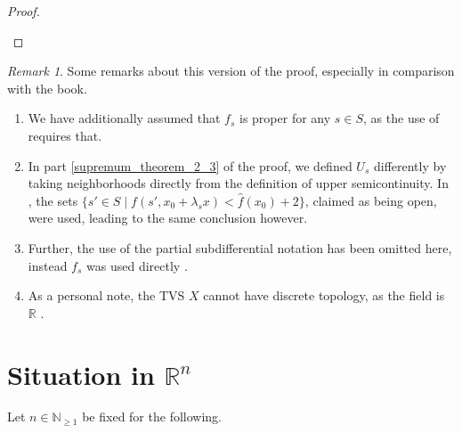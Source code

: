 \documentclass[10pt, leqno]{amsart}
\theoremstyle{definition}
\theoremstyle{remark}
\newtheorem{remark}[theorem]{Remark}
\newcommand{\draftcommentdone}{}
\begin{document}
\begin{proof}
\begin{enumerate}[label=(\roman*), wide]
\begin{enumerate}[label=(\alph*), wide]
\begin{enumerate}[label=\arabic*., wide]
                    
                \end{enumerate}
            \end{enumerate}
        \end{enumerate}
    \end{proof}

    \begin{remark}
        Some remarks about this version of the proof, especially in comparison with the book.
        \begin{enumerate}[label=(\roman*), wide]
            \item We have additionally assumed that \(f_s\) is proper for any \(s \in S\), as the use of \cite[p. 199]{IoffeTihomirov} requires that.
            \item In part \ref{supremum_theorem_2_3} of the proof, we defined \(U_s\) differently by taking neighborhoods directly from the definition of upper semicontinuity. In \cite[pp. 201-204]{IoffeTihomirov}, the sets \(\{s' \in S \mid f(s', x_0 + \lambda_s x) < \hat{f}(x_0) + 2\}\), claimed as being open, were used, leading to the same conclusion however.
            \item Further, the use of the partial subdifferential notation has been omitted here, instead \(f_s\) was used directly \cite[p. 47]{IoffeTihomirov}.
            \item As a personal note, the TVS \(X\) cannot have discrete topology, as the field is \(\mathbb{R}\) \cite[p. 426]{Werner}.
        \end{enumerate}
    \end{remark}

    \section{Situation in \(\mathbb{R}^n\) \draftcommentdone}

    Let \(n \in \mathbb{N}_{\geq 1}\) be fixed for the following.
\end{document}
